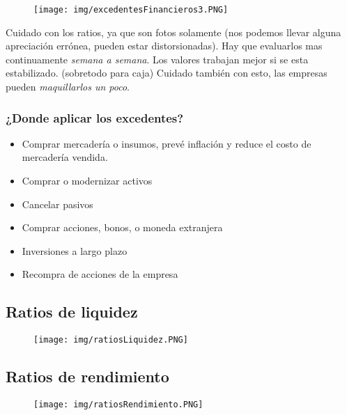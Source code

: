 \documentclass[titlepage,a4paper]{article}
\begin{document}
\newpage
\begin{figure}[!htb]
    \centering
    \texttt{[image: img/excedentesFinancieros3.PNG]}
\end{figure}

Cuidado con los ratios, ya que son fotos solamente (nos podemos llevar alguna apreciación errónea, pueden estar distorsionadas). Hay que evaluarlos mas continuamente \textit{semana a semana}. Los valores trabajan mejor si se esta estabilizado. (sobretodo para caja)
Cuidado también con esto, las empresas pueden \textit{maquillarlos un poco}.


\subsubsection*{¿Donde aplicar los excedentes?}
\begin{itemize}
\item Comprar mercadería o insumos, prevé inflación y reduce el costo de mercadería vendida.
\item Comprar o modernizar activos
\item Cancelar pasivos
\item Comprar acciones, bonos, o moneda extranjera
\item Inversiones a largo plazo
\item Recompra de acciones de la empresa
\end{itemize}


\subsection{Ratios de liquidez}
\begin{figure}[!htb]
    \centering
    \texttt{[image: img/ratiosLiquidez.PNG]}
\end{figure}

\newpage
\subsection{Ratios de rendimiento} %

\begin{figure}[!htb]
    \centering
    \texttt{[image: img/ratiosRendimiento.PNG]}
\end{figure}
\end{document}
